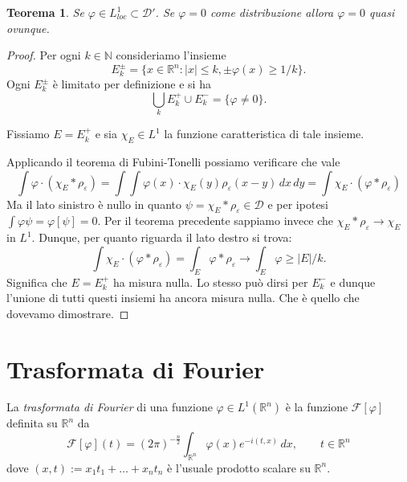\documentclass[italian,a4paper,oneside,headinclude]{scrbook}
\newcommand{\eps}{\varepsilon}
\renewcommand{\phi}{\varphi}
\newcommand{\loc}{\mathit{loc}}
\newcommand{\D}{\mathcal D}
\newcommand{\F}{\mathcal F}
\newcommand{\NN}{\mathbb N}
\newcommand{\RR}{\mathbb R}
\newcommand{\abs}[1]{{\left|#1\right|}}
\newcommand{\defeq}{:=}
\newtheorem{theorem}{Teorema}
\begin{document}
\begin{theorem}\label{th:Lambdaf}
  Se $\phi\in L^1_\loc\subset \D'$. Se $\phi=0$ come distribuzione
  allora $\phi=0$ quasi ovunque.
\end{theorem}
%
\begin{proof}
  Per ogni $k\in \NN$ consideriamo l'insieme
  \[
  E_k^\pm = \{x\in \RR^n \colon \abs{x}\le k, \pm\phi(x) \ge 1/k\}.
  \]
  Ogni $E_k^\pm$ è limitato per definizione e si ha
  \[
   \bigcup_k E_k^+ \cup E_k^- = \{\phi\neq 0\}.
  \]

  Fissiamo $E=E_k^+$ e sia $\chi_E \in L^1$ la funzione caratteristica di tale
  insieme.

  Applicando il teorema di Fubini-Tonelli possiamo verificare che vale
  \[
  \int \phi \cdot (\chi_E * \rho_\eps)
  = \int \int \phi(x) \cdot \chi_E(y) \rho_\eps(x-y)\, dx\, dy
  = \int \chi_E\cdot (\phi * \rho_\eps)
  \]
  Ma il lato sinistro è nullo in quanto $\psi=\chi_E*\rho_\eps\in \D$ e per
  ipotesi $\int \phi\psi = \phi[\psi] = 0$.
  Per il teorema precedente sappiamo invece che
  $\chi_E*\rho_\eps\to \chi_E$ in $L^1$.
  Dunque, per quanto riguarda il lato destro si trova:
  \[
  \int \chi_E \cdot (\phi*\rho_\eps) = \int_E \phi*\rho_\eps \to
  \int_E \phi \ge \abs{E}/k.
  \]
  Significa che $E=E_k^+$ ha misura nulla. Lo stesso può dirsi per
  $E_k^-$ e dunque l'unione di tutti questi insiemi ha ancora misura
  nulla. Che è quello che dovevamo dimostrare.
\end{proof}

\chapter{Trasformata di Fourier}

La \emph{trasformata di Fourier} di una funzione $\phi\in L^1(\RR^n)$ è
\marginpar{$\F$}
la funzione $\F[\phi]$ definita su $\RR^n$ da
\[
\F[\phi](t) = (2\pi)^{-\frac n 2}
\int_{\RR^n} \phi(x) e^{-i(t,x)}\,dx,
\qquad t \in \RR^n
\]
dove $(x,t)\defeq x_1 t_1 + \dots + x_n t_n$ è l'usuale prodotto
scalare su $\RR^n$.
\end{document}
